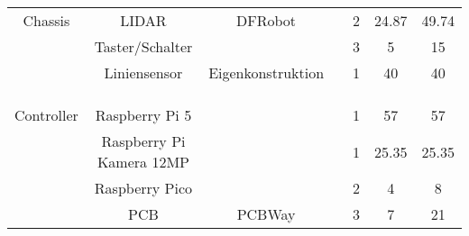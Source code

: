 \documentclass[main.tex]{subfiles} %
\begin{document}
\begin{landscape}
\begin{table}[h]
{\begin{tabular}{|c|c|c|c|c|c|c|}
                            &                            &                        &                                    &                     &                            &                                 \\ \hline
        Chassis             & LIDAR                      & DFRobot                &                                    & 2                   & 24.87                      & 49.74                           \\ \hline
                            & Taster/Schalter            &                        &                                    & 3                   & 5                          & 15                              \\ \hline
                            & Liniensensor               & Eigenkonstruktion      &                                    & 1                   & 40                         & 40                              \\ \hline
                            &                            &                        &                                    &                     &                            &                                 \\ \hline
                            &                            &                        &                                    &                     &                            &                                 \\ \hline
                            &                            &                        &                                    &                     &                            &                                 \\ \hline
        Controller          & Raspberry Pi 5             &                        &                                    & 1                   & 57                         & 57                              \\ \hline
                            & Raspberry Pi Kamera 12MP   &                        &                                    & 1                   & 25.35                      & 25.35                           \\ \hline
                            & Raspberry Pico             &                        &                                    & 2                   & 4                          & 8                               \\ \hline
                            & PCB                        & PCBWay                 &                                    & 3                   & 7                          & 21                              \\ \hline

\end{tabular}}
\end{table}
\end{landscape}
\end{document}
